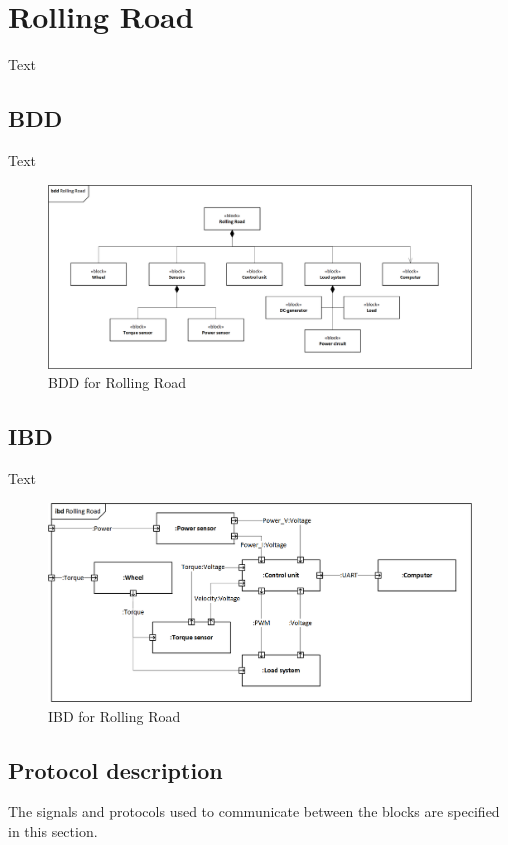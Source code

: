\section{Rolling Road}
Text

\subsection{BDD}
Text

\begin{figure}[H]
	\centering
	\includegraphics[width=0.9\linewidth]{Architecture/BDD_RollingRoad}
	\caption{BDD for Rolling Road}
	\label{fig:RR_BDD}
\end{figure}

\subsection{IBD}
Text

\begin{figure}[H]
	\centering
	\includegraphics[width=0.9\linewidth]{Architecture/IBD_RollingRoad}
	\caption{IBD for Rolling Road}
	\label{fig:RR_IBD}
\end{figure}

\subsection{Protocol description}
The signals and protocols used to communicate between the blocks are specified in this section.

